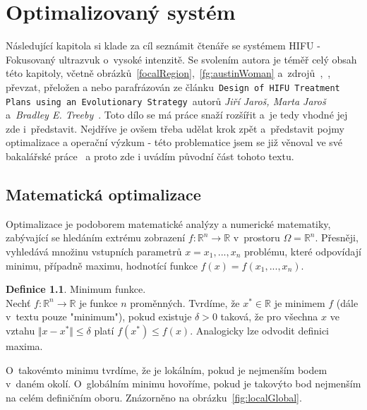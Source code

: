 \chapter{Optimalizovaný systém}
\label{about}
Následující kapitola si klade za cíl seznámit čtenáře se systémem HIFU - Fokusovaný ultrazvuk o~vysoké intenzitě. Se svolením autora je téměř celý obsah této kapitoly, včetně obrázků~\ref{focalRegion},~\ref{fg:austinWoman} a~zdrojů~\cite{BLOODOCCLUSION},~\cite{HIFUTHERMALMODEL},~\cite{HIFUPropagation} převzat, přeložen a nebo parafrázován ze článku~\texttt{Design of HIFU Treatment Plans using an Evolutionary Strategy}~autorů \textit{Jiří Jaroš, Marta Jaroš} a~\textit{Bradley E. Treeby}~\cite{FITPUB11696}. Toto dílo se má práce snaží rozšířit a~je tedy vhodné jej zde i~představit. Nejdříve je ovšem třeba udělat krok zpět a~představit pojmy optimalizace a operační výzkum - této problematice jsem se již věnoval ve své bakalářské práce~\cite{Chlebik2017} a proto zde i uvádím původní část tohoto textu.

\section{Matematická optimalizace} \label{subsec:MatOpt}
Optimalizace je podoborem matematické analýzy a numerické matematiky, zabývající se hledáním extrému zobrazení \(f: \mathbb{R}^n \rightarrow \mathbb{R}\) v~prostoru \(\Omega = \mathbb{R}^n\). Přesněji, vyhledává množinu vstupních parametrů \( x = x_{1}, ... , x_{n} \) problému, které odpovídají minimu, případně maximu, hodnotící funkce \( f(x) = f(x_{1}, ... , x_{n})\).

\theoremstyle{definition}
\newtheorem{definition}{Definice}
\theoremstyle{definition}
\begin{definition} {Minimum funkce.\\}
Nechť \(f: \mathbb{R}^n \rightarrow \mathbb{R}\) je funkce \(n\) proměnných. Tvrdíme, že \(x^* \in \mathbb{R}\) je minimem \(f\) (dále v~textu pouze "minimum"), pokud existuje \(\delta > 0\) taková, že pro všechna \(x\) ve vztahu 
\(\Vert x - x^* \Vert \leq \delta\) platí
\(f(x^*) \leq f(x)\). Analogicky lze odvodit definici maxima.
\label{def:minim}
\end{definition}

O~takovémto minimu tvrdíme, že je lokálním, pokud je nejmenším bodem v~daném okolí. O~globálním minimu hovoříme, pokud je takovýto bod nejmenším na celém definičním oboru. Znázorněno na obrázku~\ref{fig:localGlobal}.

